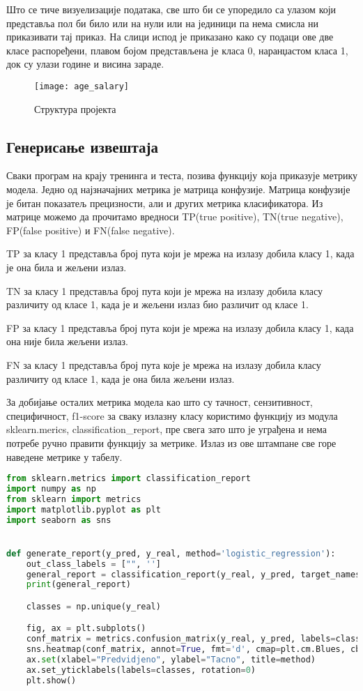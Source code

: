 \documentclass[11pt]{article} %
\begin{document}
Што се тиче визуелизације података, све што би се упоредило са улазом који представља пол би било или на нули или на јединици па нема смисла ни приказивати тај приказ. На слици испод је приказано како су подаци ове две класе распоређени, плавом бојом представљена је класа 0, наранџастом класа 1, док су улази године и висина зараде.

\begin{figure}[h]
\centering
	\texttt{[image: age\_salary]} 
	\caption{Структура пројекта} 
\end{figure}

\subsection{Генерисање извештаја}

Сваки програм на крају тренинга и теста,  позива функцију која приказује метрику модела. Једно од најзначајних метрика је матрица конфузије. Матрица конфузије је битан показатељ прецизности, али и других метрика класификатора. Из матрице можемо да прочитамо вредноси TP(true positive), TN(true negative), FP(false positive) и FN(false negative).

	TP за класу 1 представља број пута који је мрежа на излазу добила класу 1, када је она била и жељени излаз.
	
	TN за класу 1 представља број пута који је мрежа на излазу добила класу различиту од класе 1, када је и жељени 
	излаз био различит од класе 1.
	
	FP за класу 1 представља број пута који је мрежа на излазу добила класу 1, када она није била жељени излаз.
	
	FN за класу 1 представља број пута које је мрежа на излазу добила класу различиту од класе 1, када је она била жељени излаз.

За добијање осталих метрика модела као што су тачност, сензитивност, специфичност, f1-score за сваку излазну класу користимо функцију из модула sklearn.merics, classification\_report, пре свега зато што је уграђена и нема потребе ручно правити функцију за метрике. Излаз из ове штампане све горе наведене метрике у табелу.

\begin{lstlisting}[language=Python,title=Пример 3. /classifiers/utils.py - `генерисање извештаја`]
from sklearn.metrics import classification_report
import numpy as np
from sklearn import metrics
import matplotlib.pyplot as plt
import seaborn as sns


def generate_report(y_pred, y_real, method='logistic_regression'):
    out_class_labels = ["", '']
    general_report = classification_report(y_real, y_pred, target_names=out_class_labels)
    print(general_report)

    classes = np.unique(y_real)

    fig, ax = plt.subplots()
    conf_matrix = metrics.confusion_matrix(y_real, y_pred, labels=classes)
    sns.heatmap(conf_matrix, annot=True, fmt='d', cmap=plt.cm.Blues, cbar=False)
    ax.set(xlabel="Predvidjeno", ylabel="Tacno", title=method)
    ax.set_yticklabels(labels=classes, rotation=0)
    plt.show()


\end{lstlisting}
\end{document}
